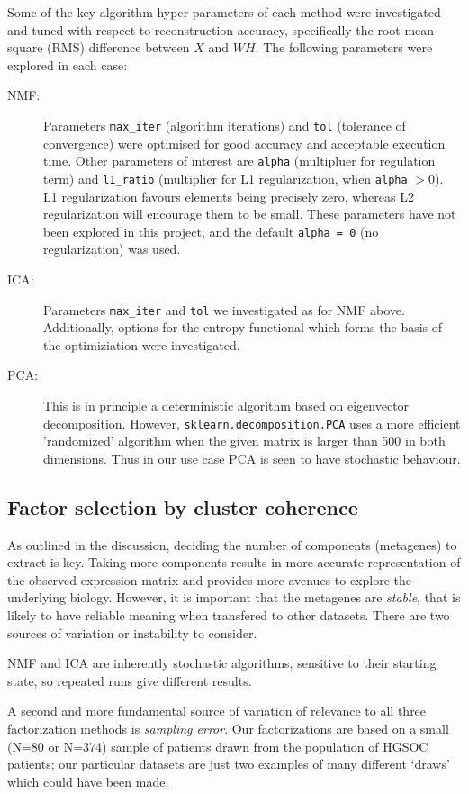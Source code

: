 \documentclass[draft, tikz, 12pt,a4paper,oneside,fleqn]{article}
\begin{document}
Some of the key algorithm hyper parameters of each method were investigated and tuned with respect to reconstruction accuracy, specifically the root-mean square (RMS) difference between $X$ and $WH$. The following parameters were explored in each case:
\begin{description}
\item[NMF:] Parameters {\tt max\_iter} (algorithm iterations) and {\tt tol} (tolerance of convergence) were optimised for good accuracy and acceptable execution time.  Other parameters of interest are {\tt alpha} (multipluer for regulation term) and {\tt l1\_ratio} (multiplier for L1 regularization, when {\tt alpha} $> 0$).  L1 regularization  favours elements being precisely zero, whereas L2 regularization will encourage them to be small.  These parameters have not been explored in this project, and the default {\tt alpha = 0} (no regularization) was used.
\item[ICA:]  Parameters {\tt max\_iter} and {\tt tol} we investigated as for NMF above.  Additionally, options for the entropy functional which forms the basis of the optimiziation were investigated.
\item[PCA:] This is in principle a deterministic algorithm based on eigenvector decomposition.  However, {\tt sklearn.decomposition.PCA} uses a more efficient 'randomized' algorithm when the given matrix is larger than 500 in both dimensions.  Thus in our use case PCA is seen to have stochastic behaviour.

\end{description}

\subsection{Factor selection by cluster coherence}

As outlined in the discussion, deciding the number of components (metagenes) to extract is key.  Taking more components results in more accurate representation of the observed expression matrix and provides more avenues to explore the underlying biology.  However, it is important that the metagenes are \emph{stable}, that is likely to have reliable meaning when transfered to other datasets.   There are two sources of variation or instability to consider.

NMF and ICA are inherently stochastic algorithms, sensitive to their starting state, so repeated runs give different results.

A second and more fundamental source of variation of relevance to all three factorization methods is \emph{sampling error}.   Our factorizations are based on a small (N=80 or N=374) sample of patients drawn from the population of HGSOC patients; our particular datasets are just two examples of many different `draws' which could have been made.  
\end{document}
